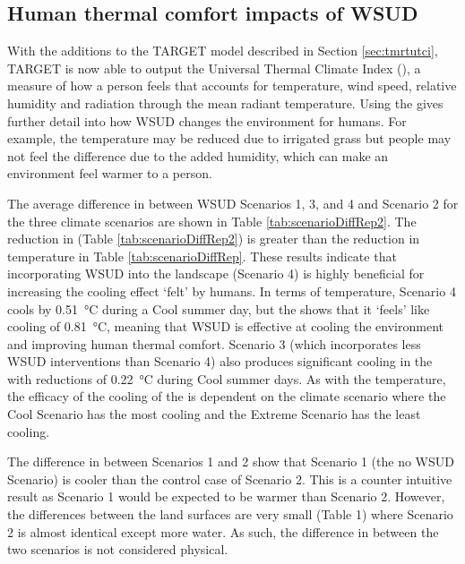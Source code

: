 \documentclass[final,3p,times,authoryear]{elsarticle}
\begin{document}
\subsection{Human thermal comfort impacts of WSUD}\label{sec:results_htc}

With the additions to the TARGET model described in Section \ref{sec:tmrtutci}, TARGET is now able to output the Universal Thermal Climate Index (), a measure of how a person feels that accounts for temperature, wind speed, relative humidity and radiation through the mean radiant temperature. Using the  gives further detail into how WSUD changes the environment for humans. For example, the temperature may be reduced due to irrigated grass but people may not feel the difference due to the added humidity, which can make an environment feel warmer to a person.

The average difference in  between WSUD Scenarios 1, 3, and 4 and Scenario 2 for the three climate scenarios are shown in Table \ref{tab:scenarioDiffRep2}. The reduction in  (Table \ref{tab:scenarioDiffRep2}) is greater than the reduction in temperature in Table \ref{tab:scenarioDiffRep}. These results indicate that incorporating WSUD into the landscape (Scenario 4) is highly beneficial for increasing the cooling effect `felt' by humans. In terms of temperature, Scenario 4 cools by 0.51\SI{}{\degreeCelsius} during a Cool summer day, but the  shows that it ‘feels’ like cooling of 0.81\SI{}{\degreeCelsius}, meaning that WSUD is effective at cooling the environment and improving human thermal comfort. Scenario 3 (which incorporates less WSUD interventions than Scenario 4) also produces significant cooling in the  with reductions of 0.22\SI{}{\degreeCelsius} during Cool summer days. As with the temperature, the efficacy of the cooling of the  is dependent on the climate scenario where the Cool Scenario has the most cooling and the Extreme Scenario has the least cooling. 

The difference in  between Scenarios 1 and 2 show that Scenario 1 (the no WSUD Scenario) is cooler than the control case of Scenario 2. This is a counter intuitive result as Scenario 1 would be expected to be warmer than Scenario 2. However, the differences between the land surfaces are very small (Table 1) where Scenario 2 is almost identical except more water. As such, the difference in  between the two scenarios is not considered physical. 
\end{document}

